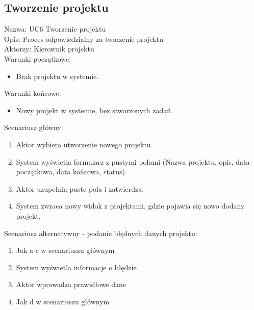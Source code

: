 \subsection{Tworzenie projektu}
\begin{adjustwidth}{5em}{0pt}
Nazwa: UC6 Tworzenie projektu\\
Opis: Proces odpowiedzialny za tworzenie projektu\\
Aktorzy: Kierownik projektu \\
Warunki początkowe:
\begin{itemize}
\item Brak projektu w systemie.
\end{itemize}
Warunki końcowe:
\begin{itemize}
\item Nowy projekt w systemie, bez stworzonych zadań.
\end{itemize}
Scenariusz główny:
\begin{enumerate}
\item Aktor wybiera utworzenie nowego projektu.
\item System wyświetla formularz z pustymi polami (Nazwa projektu, opis, data początkowa, data końcowa, status)
\item Aktor uzupełnia puste pola i zatwierdza.
\item System zwraca nowy widok z projektami, gdzie pojawia się nowo dodany projekt.
\end{enumerate}
Scenariusz alternatywny - podanie błędnych danych projektu: 
\begin{enumerate}
\item Jak a-c w scenariuszu głównym
\item System wyświetla informacje o błędzie
\item Aktor wprowadza prawidłowe dane
\item Jak d w scenariuszu głównym
\end{enumerate}
\end{adjustwidth}

